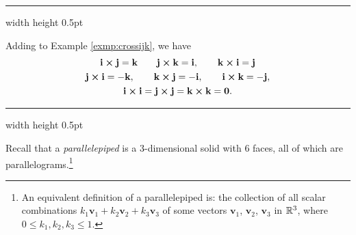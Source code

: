 \vspace{2mm}
\hrule width \textwidth height 0.5pt
\begin{exmp}\label{exmp:crossijkfull}
 Adding to Example \ref{exmp:crossijk}, we have
 \begin{gather*}
  \textbf{i} \bm{\times} \textbf{j} = \textbf{k} \qquad \textbf{j} \bm{\times} \textbf{k} = \textbf{i}, 
  \qquad
   \textbf{k} \bm{\times} \textbf{i} = \textbf{j}\\
  \textbf{j} \bm{\times} \textbf{i} = -\textbf{k}, 
  \qquad \textbf{k} \bm{\times} \textbf{j} = -\textbf{i}, 
  \qquad
   \textbf{i} \bm{\times} \textbf{k} = -\textbf{j},
   \\
  \textbf{i} \bm{\times} \textbf{i} = \textbf{j} \bm{\times} \textbf{j} = \textbf{k} \bm{\times} \textbf{k} =
  \textbf{0}.
 \end{gather*}
\end{exmp}
\hrule width \textwidth height 0.5pt
\vspace{4mm}

Recall that a \emph{parallelepiped} is a 3-dimensional solid with 6 faces, all of
which are parallelograms.\footnote{An equivalent definition of a  parallelepiped is: the collection of
all scalar combinations $k_{1}\textbf{v}_{1} + k_{2}\textbf{v}_{2} + k_{3}\textbf{v}_{3}$ of some vectors
$\textbf{v}_{1}$, $\textbf{v}_{2}$, $\textbf{v}_{3}$ in $\mathbb{R}^{3}$, where $0 \le k_{1}, k_{2}, k_{3} \le 1$.}

